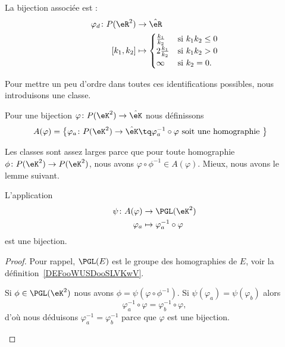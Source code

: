 La bijection associée est :
\begin{equation}        \label{EQooMIGCooAtXPaS}
	\begin{aligned}
		\varphi_d\colon P(\eR^2) & \to \hat\eR                                            \\
		[k_1,k_2]                & \mapsto \begin{cases}
			                                   \frac{ k_1 }{ k_2 }  & \text{si } k_1k_2\leq 0 \\
			                                   2\frac{ k_1 }{ k_2 } & \text{si } k_1k_2>0     \\
			                                   \infty               & \text{si } k_2=0.
		                                   \end{cases}
	\end{aligned}
\end{equation}

Pour mettre un peu d'ordre dans toutes ces identifications possibles, nous introduisons une classe.

\begin{definition}      \label{DEFooMLQUooGwvQMh}
	Pour une bijection \( \varphi\colon P(\eK^2)\to \hat\eK\) nous définissons
	\begin{equation}
		\begin{aligned}[]
			A(\varphi)=\big\{  \varphi_a\colon P(\eK^2) & \to \hat\eK \tq \varphi_a^{-1}\circ\varphi
			\text{ soit une homographie } \big\}
		\end{aligned}
	\end{equation}
\end{definition}

Les classes sont assez larges parce que pour toute homographie \( \phi\colon P(\eK^2)\to P(\eK^2)\), nous avons \( \varphi\circ\phi^{-1}\in A(\varphi)\). Mieux, nous avons le lemme suivant.

\begin{lemma}
	L'application
	\begin{equation}
		\begin{aligned}
			\psi\colon A(\varphi) & \to \PGL(\eK^2)                    \\
			\varphi_a             & \mapsto \varphi_a^{-1}\circ\varphi
		\end{aligned}
	\end{equation}
	est une bijection.
\end{lemma}

\begin{proof}
	Pour rappel, \( \PGL(E)\) est le groupe des homographies de \( E\), voir la définition~\ref{DEFooWUSDooSLVKwV}.
	\begin{subproof}
		\spitem[Surjectif]
		Si \( \phi\in\PGL(\eK^2)\) nous avons \( \phi=\psi(\varphi\circ\phi^{-1})\).
		\spitem[Injectif]
		Si \( \psi(\varphi_a)=\psi(\varphi_b)\) alors
		\begin{equation}
			\varphi_a^{-1}\circ\varphi=\varphi_b^{-1}\circ\varphi,
		\end{equation}
		d'où nous déduisons \( \varphi_a^{-1}=\varphi_b^{-1}\) parce que \( \varphi\) est une bijection.
	\end{subproof}
\end{proof}

